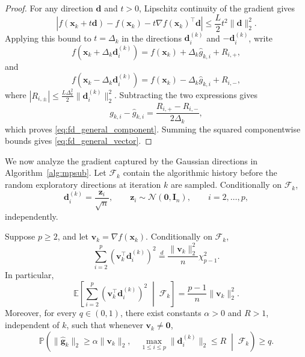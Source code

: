 \documentclass{siamart171218}
\newcommand{\bx}{\bm{x}}
\newcommand{\bd}{\bm{d}}
\newcommand{\bg}{\bm{g}}
\newcommand{\bz}{\bm{z}}
\begin{document}
\begin{proof}
For any direction $\bd$ and $t>0$, Lipschitz continuity of the gradient gives
\[
\left| f(\bx_k+t\bd) - f(\bx_k) - t\nabla f(\bx_k)^\top\bd \right| \le \frac{L}{2}t^2\|\bd\|_2^2.
\]
Applying this bound to $t=\Delta_k$ in the directions $\bd_i^{(k)}$ and $-\bd_i^{(k)}$, write
\[
f(\bx_k+\Delta_k\bd_i^{(k)}) = f(\bx_k) + \Delta_k\hat g_{k,i} + R_{i,+},
\]
and
\[
f(\bx_k-\Delta_k\bd_i^{(k)}) = f(\bx_k) - \Delta_k\hat g_{k,i} + R_{i,-},
\]
where $|R_{i,\pm}| \le \frac{L\Delta_k^2}{2} \|\bd_i^{(k)}\|_2^2$.
Subtracting the two expressions gives
\[
g_{k,i}-\hat g_{k,i} = \frac{R_{i,+}-R_{i,-}}{2\Delta_k},
\]
which proves \eqref{eq:fd_general_component}. Summing the squared componentwise bounds gives \eqref{eq:fd_general_vector}.
\end{proof}
We now analyze the gradient captured by the Gaussian directions in Algorithm~\ref{alg:mpsub}. Let $\mathcal F_k$ contain the algorithmic history before the random exploratory directions at iteration $k$ are sampled. Conditionally on $\mathcal F_k$,
\[
\bd_i^{(k)} = \frac{\bz_i}{\sqrt n}, \qquad \bz_i\sim\mathcal N(\bm0,\bm I_n), \qquad i=2,\ldots,p,
\]
independently.

\begin{lemma}
\label{lem:gaussian_capture}
\label{lem:capture}
Suppose $p\ge 2$, and let $\bm v_k = \nabla f(\bx_k)$. Conditionally on $\mathcal F_k$,
\begin{equation}
\label{eq:chi_square_capture}
\sum_{i=2}^p \left( \bm v_k^\top\bd_i^{(k)} \right)^2 \overset{d}{=} \frac{\|\bm v_k\|_2^2}{n} \chi^2_{p-1}.
\end{equation}
In particular,
\begin{equation}
\label{eq:expected_gaussian_capture}
\mathbb E \left[ \sum_{i=2}^p \left( \bm v_k^\top\bd_i^{(k)} \right)^2 \;\middle|\; \mathcal F_k \right] = \frac{p-1}{n} \|\bm v_k\|_2^2.
\end{equation}
Moreover, for every $q\in(0,1)$, there exist constants $\alpha>0$ and $R>1$, independent of $k$, such that whenever $\bm v_k\ne\bm 0$,
\begin{equation}
\label{eq:good_frame_probability}
\mathbb P \left( \|\hat{\bg}_k\|_2 \ge \alpha\|\bm v_k\|_2, \quad \max_{1\le i\le p} \|\bd_i^{(k)}\|_2 \le R \;\middle|\; \mathcal F_k \right) \ge q.
\end{equation}
\end{lemma}
\end{document}
